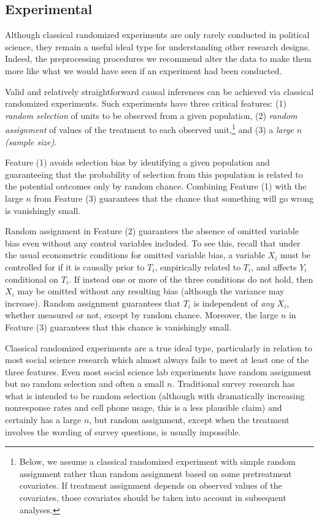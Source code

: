 \documentclass[11pt,titlepage]{article}
\begin{document}
\subsection{Experimental}

Although classical randomized experiments are only rarely conducted in
political science, they remain a useful ideal type for understanding
other research designs.  Indeed, the preprocessing procedures we
recommend alter the data to make them more like what we would have
seen if an experiment had been conducted.

Valid and relatively straightforward causal inferences can be achieved
via classical randomized experiments.  Such experiments have three
critical features: (1) \emph{random selection} of units to be observed
from a given population, (2) \emph{random assignment} of values of the
treatment to each observed unit,\footnote{Below, we assume a classical
  randomized experiment with simple random assignment rather than
  random assignment based on some pretreatment covariates.  If
  treatment assignment depends on observed values of the covariates,
  those covariates should be taken into account in subsequent analyses.}
and (3) a \emph{large $n$ (sample size)}.

Feature (1) avoids selection bias by identifying a given population
and guaranteeing that the probability of selection from this
population is related to the potential outcomes only by random chance.
Combining Feature (1) with the large $n$ from Feature (3) guarantees
that the chance that something will go wrong is vanishingly small.

Random assignment in Feature (2) guarantees the absence of omitted
variable bias even without any control variables included.  To see
this, recall that under the usual econometric conditions for omitted
variable bias, a variable $X_i$ must be controlled for if it is
causally prior to $T_i$, empirically related to $T_i$, and affects
$Y_i$ conditional on $T_i$.  If instead one or more of the three
conditions do not hold, then $X_i$ may be omitted without any
resulting bias (although the variance may increase).  Random
assignment guarantees that $T_i$ is independent of \emph{any} $X_i$,
whether measured or not, except by random chance.  Moreover, the large
$n$ in Feature (3) guarantees that this chance is vanishingly small.

Classical randomized experiments are a true ideal type, particularly
in relation to most social science research which almost always fails
to meet at least one of the three features.  Even most social science
lab experiments have random assignment but no random selection and
often a small $n$.  Traditional survey research has what is intended
to be random selection (although with dramatically increasing
nonresponse rates and cell phone usage, this is a less plausible
claim) and certainly has a large $n$, but random assignment, except
when the treatment involves the wording of survey questions, is
usually impossible.
\end{document}

